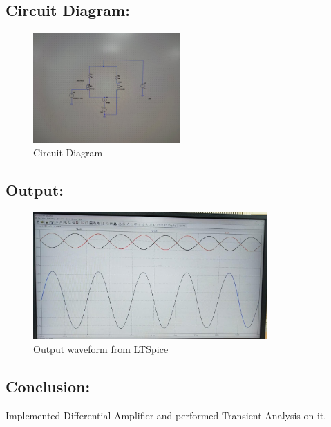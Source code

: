 \documentclass[a4paper,12pt]{report}
\begin{document}
  \vspace{0.3cm}

  \subsection{Circuit Diagram:} 
    \begin{figure}[htbp]
    \centering
      \includegraphics[width=0.5\textwidth]{../Img/E1Ckt.jpeg}
    \caption{Circuit Diagram}
    \label{fig:image}
    \end{figure}

    \vspace*{\fill} %
    \newpage

  \subsection{Output:} 
    \begin{figure}[h!]
        \centering
        \includegraphics[width=0.8\textwidth]{../Img/E1Tran.jpeg}
        \caption{Output waveform from LTSpice}
    \end{figure}

  \vspace{0.3cm}

  \subsection{Conclusion:} 
    \hspace{20pt}Implemented Differential Amplifier and performed Transient Analysis on it.
\end{document}
